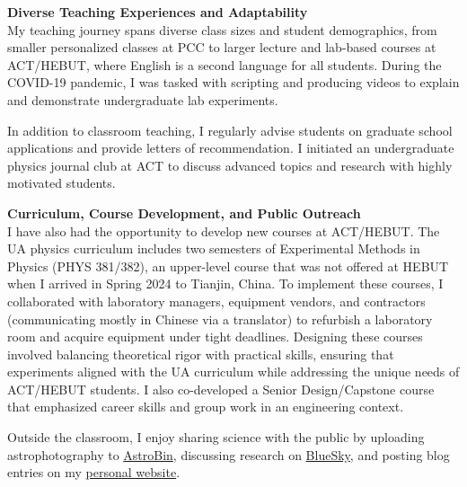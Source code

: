 \documentclass[11pt]{article}
\begin{document}
\vspace{1em}

{\noindent\Large\textbf{Diverse Teaching Experiences and Adaptability}}\\
My teaching journey spans diverse class sizes and student demographics, from smaller personalized classes at PCC to larger lecture and lab-based courses at ACT/HEBUT, where English is a second language for all students. During the COVID-19 pandemic, I was tasked with scripting and producing videos to explain and demonstrate undergraduate lab experiments. 

In addition to classroom teaching, I regularly advise students on graduate school applications and provide letters of recommendation. I initiated an undergraduate physics journal club at ACT to discuss advanced topics and research with highly motivated students.

\vspace{1em}

{\noindent\Large\textbf{Curriculum, Course Development, and Public Outreach}}\\
I have also had the opportunity to develop new courses at ACT/HEBUT. The UA physics curriculum includes two semesters of Experimental Methods in Physics (PHYS 381/382), an upper-level course that was not offered at HEBUT when I arrived in Spring 2024 to Tianjin, China. To implement these courses, I collaborated with laboratory managers, equipment vendors, and contractors (communicating mostly in Chinese via a translator) to refurbish a laboratory room and acquire equipment under tight deadlines. Designing these courses involved balancing theoretical rigor with practical skills, ensuring that experiments aligned with the UA curriculum while addressing the unique needs of ACT/HEBUT students. I also co-developed a Senior Design/Capstone course that emphasized career skills and group work in an engineering context. 

Outside the classroom, I enjoy sharing science with the public by uploading astrophotography to \href{https://www.astrobin.com/users/djinn/}{AstroBin}, discussing research on \href{https://bsky.app/profile/ajsteinmetz.com}{BlueSky}, and posting blog entries on my \href{https://ajsteinmetz.github.io/}{personal website}.
\end{document}
